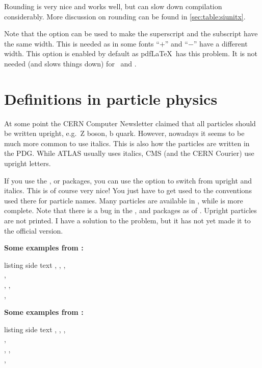Rounding is very nice and works well, but can slow down compilation considerably.
More discussion on rounding can be found  in \cref{sec:table:siunitx}.

Note that the option  can be used to make the superscript and the subscript
have the same width.
This is needed as in some fonts \enquote{\(+\)} and \enquote{\(-\)} have a different width.
This option is enabled by default as pdf\LaTeX\ has this problem.
It is not needed (and slows things down) for \LuaLaTeX\ and \XeLaTeX.

\section{Definitions in particle physics}%
\label{sec:tips:hepparticles}

At some point the CERN Computer Newsletter claimed that all particles should be written
upright, e.g.\ \(\text{Z}\) boson, \(\text{b}\) quark.
However, nowadays it seems to be much more common to use italics.
This is also how the particles are written in the PDG\@.
While ATLAS usually uses italics, CMS (and the CERN Courier) use upright letters.

If you use the ,  or  packages,
you can use the option  to switch from upright and italics.
This is of course very nice!
You just have to get used to the conventions used there for particle names.
Many particles are available in ,
while  is more complete.
Note that there is a bug in the
,  and  packages
as of .
Upright particles are not printed.
I have a solution to the problem,
but it has not yet made it to the official version.

\noindent\textbf{Some examples from :}
\begin{tcblisting}{listing side text}
\Pe, \Pl, \Pqt, \Paqt\\
\PZ, \PWpm\\
\PBz, \PBpm, \PacB\\
\PBz{}\PBz, \PBz\PBz
\end{tcblisting}

\noindent\textbf{Some examples from :}
\begin{tcblisting}{listing side text}
\APelectron, \Plepton, \Ptop, \APtop\\
\PZ, \PWpm\\
\PBzero, \PBpm, \APBc\\
\PBzero{}\PBzero, \PBzero\PBzero
\end{tcblisting}

